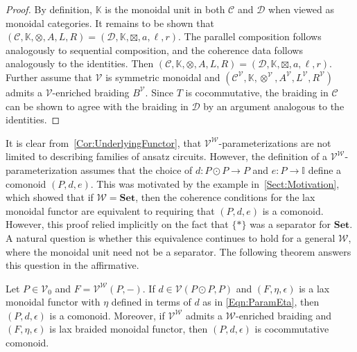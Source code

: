 \begin{proof}
    By definition, $\mathbb{K}$ is the monoidal unit in both $\mathcal{C}$ and $\mathcal{D}$ when viewed as monoidal categories.
    It remains to be shown that $( \mathcal{C}, \mathbb{K}, \otimes, A, L, R ) = ( \mathcal{D}, \mathbb{K}, \boxtimes, a, \ell, r )$.
    The parallel composition follows analogously to sequential composition, and the coherence data follows analogously to the identities.
    Then $( \mathcal{C}, \mathbb{K}, \otimes, A, L, R ) = ( \mathcal{D}, \mathbb{K}, \boxtimes, a, \ell, r )$.
    Further assume that $\mathcal{V}$ is symmetric monoidal and $( \mathcal{C}^{\mathcal{V}}, \mathbb{K}, \otimes^{\mathcal{V}}, A^{\mathcal{V}}, L^{\mathcal{V}}, R^{\mathcal{V}} )$ admits a $\mathcal{V}$-enriched braiding $B^{\mathcal{V}}$.
    Since $T$ is cocommutative, the braiding in $\mathcal{C}$ can be shown to agree with the braiding in $\mathcal{D}$ by an argument analogous to the identities.
\end{proof}

It is clear from~\cref{Cor:UnderlyingFunctor}, that $\mathcal{V}^{\mathcal{W}}$-parameterizations are not limited to describing families of ansatz circuits.
However, the definition of a $\mathcal{V}^{\mathcal{W}}$-parameterization assumes that the choice of $d: P \odot P \to P$ and $e: P \to \mathbb{I}$ define a comonoid $( P, d, e )$.
This was motivated by the example in~\cref{Sect:Motivation}, which showed that if $\mathcal{W} = \mathbf{Set}$, then the coherence conditions for the lax monoidal functor are equivalent to requiring that $( P, d, e )$ is a comonoid.
However, this proof relied implicitly on the fact that $\{ * \}$ was a separator for $\mathbf{Set}$.
A natural question is whether this equivalence continues to hold for a general $\mathcal{W}$, where the monoidal unit need not be a separator.
The following theorem answers this question in the affirmative.

\begin{thm}
    Let $P \in \mathcal{V}_0$ and $F = \mathcal{V}^{\mathcal{W}}( P, - )$.
    If $d \in \mathcal{V}( P \odot P, P )$ and $( F, \eta, \epsilon )$ is a lax monoidal functor with $\eta$ defined in terms of $d$ as in \cref{Eqn:ParamEta}, then $( P, d, \epsilon )$ is a comonoid.
    Moreover, if $\mathcal{V}^{\mathcal{W}}$ admits a $\mathcal{W}$-enriched braiding and $( F, \eta, \epsilon )$ is lax braided monoidal functor, then $( P, d, \epsilon )$ is cocommutative comonoid.
\end{thm}

